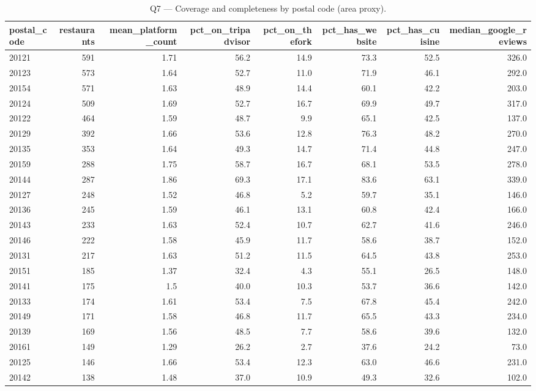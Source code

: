 \begin{table}[ht]
\centering
\caption{Q7 — Coverage and completeness by postal code (area proxy).}
\label{tab:q7_completeness_by_postal_code}
{\tiny
\begin{tabular}{lrrrrrrr}
\toprule
postal\_code & restaurants & mean\_platform\_count & pct\_on\_tripadvisor & pct\_on\_thefork & pct\_has\_website & pct\_has\_cuisine & median\_google\_reviews \\
\midrule
20121 & 591 & 1.71 & 56.2 & 14.9 & 73.3 & 52.5 & 326.0 \\
20123 & 573 & 1.64 & 52.7 & 11.0 & 71.9 & 46.1 & 292.0 \\
20154 & 571 & 1.63 & 48.9 & 14.4 & 60.1 & 42.2 & 203.0 \\
20124 & 509 & 1.69 & 52.7 & 16.7 & 69.9 & 49.7 & 317.0 \\
20122 & 464 & 1.59 & 48.7 & 9.9 & 65.1 & 42.5 & 137.0 \\
20129 & 392 & 1.66 & 53.6 & 12.8 & 76.3 & 48.2 & 270.0 \\
20135 & 353 & 1.64 & 49.3 & 14.7 & 71.4 & 44.8 & 247.0 \\
20159 & 288 & 1.75 & 58.7 & 16.7 & 68.1 & 53.5 & 278.0 \\
20144 & 287 & 1.86 & 69.3 & 17.1 & 83.6 & 63.1 & 339.0 \\
20127 & 248 & 1.52 & 46.8 & 5.2 & 59.7 & 35.1 & 146.0 \\
20136 & 245 & 1.59 & 46.1 & 13.1 & 60.8 & 42.4 & 166.0 \\
20143 & 233 & 1.63 & 52.4 & 10.7 & 62.7 & 41.6 & 246.0 \\
20146 & 222 & 1.58 & 45.9 & 11.7 & 58.6 & 38.7 & 152.0 \\
20131 & 217 & 1.63 & 51.2 & 11.5 & 64.5 & 43.8 & 253.0 \\
20151 & 185 & 1.37 & 32.4 & 4.3 & 55.1 & 26.5 & 148.0 \\
20141 & 175 & 1.5 & 40.0 & 10.3 & 53.7 & 36.6 & 142.0 \\
20133 & 174 & 1.61 & 53.4 & 7.5 & 67.8 & 45.4 & 242.0 \\
20149 & 171 & 1.58 & 46.8 & 11.7 & 65.5 & 43.3 & 234.0 \\
20139 & 169 & 1.56 & 48.5 & 7.7 & 58.6 & 39.6 & 132.0 \\
20161 & 149 & 1.29 & 26.2 & 2.7 & 37.6 & 24.2 & 73.0 \\
20125 & 146 & 1.66 & 53.4 & 12.3 & 63.0 & 46.6 & 231.0 \\
20142 & 138 & 1.48 & 37.0 & 10.9 & 49.3 & 32.6 & 102.0 \\

\end{tabular}}
\end{table}
